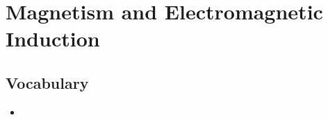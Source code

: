 \section{Magnetism and Electromagnetic Induction}

\subsection{Vocabulary}
\begin{itemize}
    \item 
\end{itemize}

